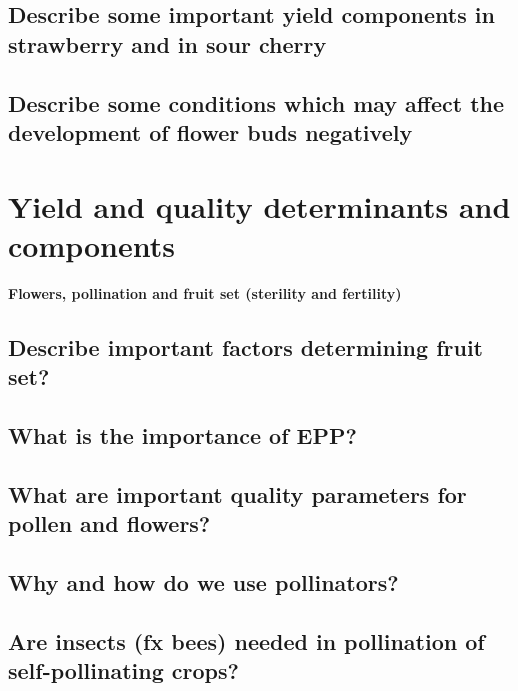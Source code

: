 \subsection{Describe some important yield components in strawberry and in sour 
cherry}
\subsection{Describe some conditions which may affect the development of 
flower buds negatively}


\section{Yield and quality determinants and components}
\textbf{Flowers, pollination and fruit set (sterility and fertility)}

\subsection{Describe important factors determining fruit set? }
\subsection{What is the importance of EPP?}
\subsection{What are important quality parameters for pollen and flowers?}
\subsection{Why and how do we use pollinators?}
\subsection{Are insects (fx bees) needed in pollination of self-pollinating crops?}


